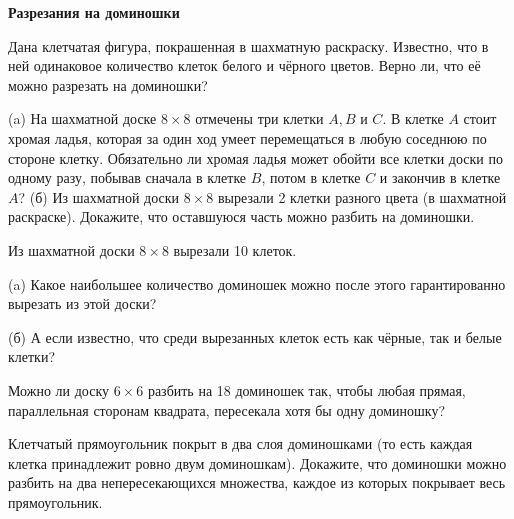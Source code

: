 \centerline{\bf \Huge Разрезания на доминошки}

\begin{flushright}
        \scriptsize{}
\end{flushright}

Дана клетчатая фигура, покрашенная в шахматную раскраску. Известно, что в ней одинаковое количество клеток белого и чёрного цветов. Верно ли, что её можно разрезать на доминошки?

(a) На шахматной доске $8 \times 8$ отмечены три клетки $A, B$ и $C$. В клетке $A$ стоит хромая ладья, которая за один ход умеет перемещаться в любую соседнюю по стороне клетку. Обязательно ли хромая ладья может обойти все клетки доски по одному разу, побывав сначала в клетке $B$, потом в клетке $C$ и закончив в клетке $A$?
(б) Из шахматной доски $8 \times 8$ вырезали 2 клетки разного цвета (в шахматной раскраске). Докажите, что оставшуюся часть можно разбить на доминошки.

Из шахматной доски $8 \times 8$ вырезали 10 клеток.

(a) Какое наибольшее количество доминошек можно после этого гарантированно вырезать из этой доски?

(б) А если известно, что среди вырезанных клеток есть как чёрные, так и белые клетки?

Можно ли доску $6 \times 6$ разбить на 18 доминошек так, чтобы любая прямая, параллельная сторонам квадрата, пересекала хотя бы одну доминошку?

Клетчатый прямоугольник покрыт в два слоя доминошками (то есть каждая клетка принадлежит ровно двум доминошкам). Докажите, что доминошки можно разбить на два непересекающихся множества, каждое из которых покрывает весь прямоугольник.